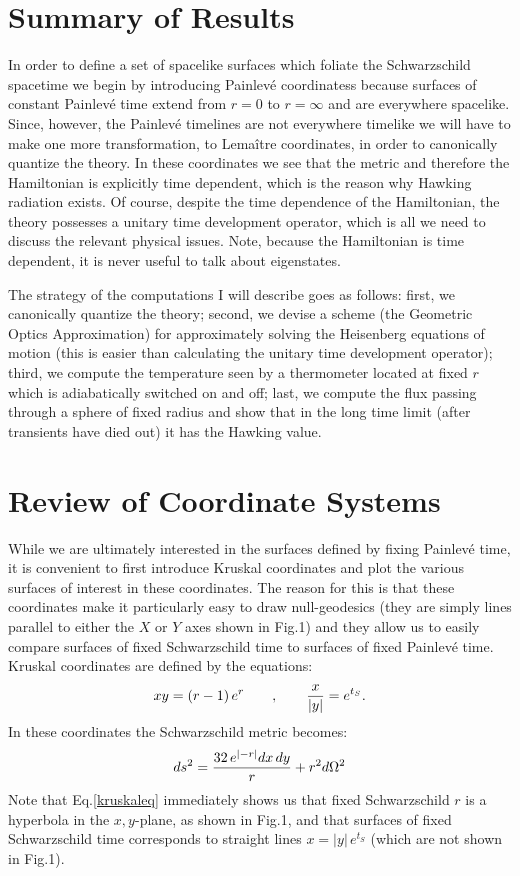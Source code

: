 \documentclass[12pt]{article}
\begin{document}
\section{Summary of Results}

In order to define a set of spacelike surfaces which
foliate the Schwarzschild spacetime we begin by introducing Painlev\'e coordinatess
because surfaces of constant Painlev\'e time extend from $r=0$ to $r=\infty$ and are
everywhere spacelike.  Since, however, the
Painlev\'e timelines are not everywhere timelike we will have to make one more transformation,
to Lema\^itre coordinates, in order to canonically quantize the theory.
In these coordinates we see that the metric and therefore the Hamiltonian
is explicitly time dependent, which is the reason why Hawking radiation exists.
Of course, despite the time dependence of the Hamiltonian, the theory possesses a
unitary time development operator, which is all we need to discuss the relevant
physical issues.  Note, because the Hamiltonian is time dependent, it is never
useful to talk about eigenstates.

The strategy of the computations I will describe goes as follows: first, we canonically
quantize the theory; second, we devise a scheme (the Geometric Optics
Approximation) for approximately solving the Heisenberg equations of motion
(this is easier than calculating the unitary time development operator); third, we
compute the temperature seen by a thermometer located at fixed $r$ which is adiabatically
switched on and off; last, we compute the flux passing through a sphere of fixed
radius and show that in the long time limit (after transients have died out)
it has the Hawking value.

\section{Review of Coordinate Systems}

While we are ultimately interested in the surfaces defined by fixing Painlev\'e time,
it is convenient to first introduce Kruskal coordinates and plot the various surfaces
of interest in these coordinates.  The reason for this is that these coordinates
make it particularly easy to draw null-geodesics (they are simply lines parallel to
either the $X$ or $Y$ axes shown in Fig.1) and they allow us to easily compare
surfaces of fixed Schwarzschild time to surfaces of fixed Painlev\'e time.
Kruskal coordinates are defined by the equations:
\begin{equation}
 x y = (r-1)\,e^{r} \qquad , \qquad
		{x \over \vert y \vert} = e^{t_S} .
\label{kruskaleq}
\end{equation}
In these coordinates the Schwarzschild metric becomes:
\begin{equation}
 ds^2 = {32\,  e^{\vert -r \vert} dx\,dy \over r} + r^2 d\Omega^2
\end{equation}
Note that Eq.\ref{kruskaleq} immediately shows us that fixed Schwarzschild $r$ is a
hyperbola in the $x,y$-plane, as shown in Fig.1, and that surfaces of fixed
Schwarzschild time corresponds to straight lines $x=\vert y \vert\,e^{t_S}$ (which are not
shown in Fig.1).
\end{document}
